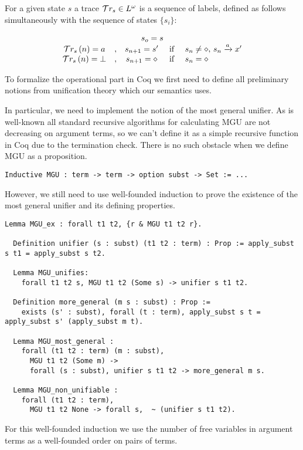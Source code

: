 For a given state $s$ a trace $\mathcal{T}r_{s}\in L^\omega$ is a sequence of labels, defined as follows simultaneously with the sequence of states $\{s_i\}$:

\[
\begin{array}{ccccl}
  \multicolumn{5}{c}{s_o=s}\\
  \tr{s}\,(n)=a &,& s_{n+1}=s'&\mbox{ if }& s_n\ne\diamond,\, s_n\xrightarrow{a} x'\\
  \tr{s}\,(n)=\bot&,&s_{n+1}=\diamond&\mbox{ if }& s_n=\diamond
\end{array}
\]


To formalize the operational part in Coq we first need to define all preliminary notions from unification theory which our semantics uses.

In particular, we need to implement the notion of the most general unifier. As is well-known all standard recursive algorithms for calculating MGU are not decreasing on argument terms, so we can't define it as a simple recursive function in Coq due to the termination check. There is no such obstacle when we define MGU as a proposition.

\begin{lstlisting}[language=Coq]
  Inductive MGU : term -> term -> option subst -> Set := ...
\end{lstlisting}

However, we still need to use well-founded induction to prove the existence of the most general unifier and its defining properties.

\begin{lstlisting}[language=Coq]
  Lemma MGU_ex : forall t1 t2, {r & MGU t1 t2 r}.
  
  Definition unifier (s : subst) (t1 t2 : term) : Prop := apply_subst s t1 = apply_subst s t2.

  Lemma MGU_unifies:
    forall t1 t2 s, MGU t1 t2 (Some s) -> unifier s t1 t2.
  
  Definition more_general (m s : subst) : Prop :=
    exists (s' : subst), forall (t : term), apply_subst s t = apply_subst s' (apply_subst m t).

  Lemma MGU_most_general :
    forall (t1 t2 : term) (m : subst),
      MGU t1 t2 (Some m) ->
      forall (s : subst), unifier s t1 t2 -> more_general m s.

  Lemma MGU_non_unifiable :
    forall (t1 t2 : term),
      MGU t1 t2 None -> forall s,  ~ (unifier s t1 t2).
\end{lstlisting}

For this well-founded induction we use the number of free variables in argument terms as a well-founded order on pairs of terms.

